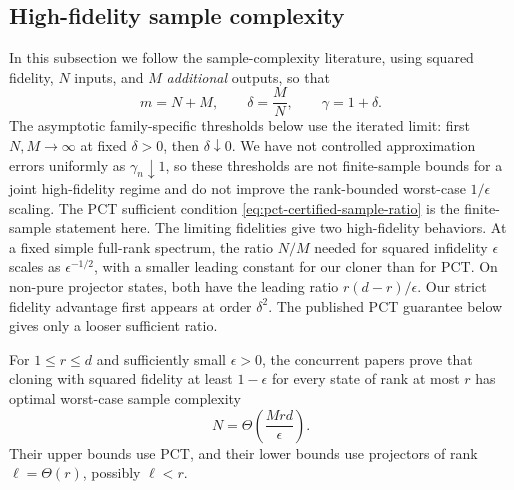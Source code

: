 \documentclass[11pt]{article}
\theoremstyle{remark}
\theoremstyle{plain}
\begin{document}
\subsection{High-fidelity sample complexity}
\label{sec:small-error}
In this subsection we follow the sample-complexity literature, using
squared fidelity, \(N\) inputs, and \(M\) \emph{additional} outputs, so that
\begin{equation}\label{eq:pct-copy-count-parameters}
  m=N+M,\qquad \delta=\frac{M}{N},\qquad \gamma=1+\delta.
\end{equation}
The asymptotic family-specific thresholds below use the iterated limit: first
\(N,M\to\infty\) at fixed \(\delta>0\), then \(\delta\downarrow0\).
We have not controlled approximation errors uniformly as
\(\gamma_n\downarrow1\), so these thresholds are not finite-sample bounds
for a joint high-fidelity regime and do not improve the rank-bounded
worst-case \(1/\epsilon\) scaling.  The PCT sufficient condition
\eqref{eq:pct-certified-sample-ratio} is the finite-sample statement here.
The limiting fidelities give two high-fidelity behaviors.  At a fixed
simple full-rank spectrum, the ratio \(N/M\) needed for squared
infidelity \(\epsilon\) scales as \(\epsilon^{-1/2}\), with a smaller
leading constant for our cloner than for PCT.  On non-pure projector
states, both have the leading ratio \(r(d-r)/\epsilon\). Our strict
fidelity advantage first appears at order \(\delta^2\).  The published
PCT guarantee below gives only a looser sufficient ratio.

For \(1\le r\le d\) and sufficiently small \(\epsilon>0\), the concurrent
papers \cite{FanizzaGrinkoScharnhorstSpilecki2026,JeonSohnOh2026} prove that
cloning with squared fidelity at least \(1-\epsilon\) for every state of
rank at most \(r\) has optimal worst-case sample complexity
\begin{equation}\label{eq:pct-uniform-copy-complexity}
  N=\Theta\!\left(\frac{Mrd}{\epsilon}\right).
\end{equation}
Their upper bounds use PCT, and their lower bounds use projectors
of rank \(\ell=\Theta(r)\), possibly \(\ell<r\).
\end{document}
